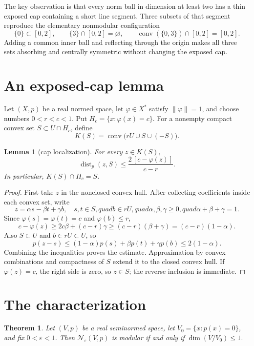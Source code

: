 \documentclass[11pt]{article}
\newtheorem{theorem}{Theorem}
\newtheorem{lemma}{Lemma}
\newcommand{\clconv}{\overline{\operatorname{conv}}}
\newcommand{\dist}{\operatorname{dist}}
\begin{document}
The key observation is that every norm ball in dimension at least two has a
thin exposed cap containing a short line segment.  Three subsets of that
segment reproduce the elementary nonmodular configuration
\[
 \{0\}\subset[0,2],\qquad \{3\}\cap[0,2]=\varnothing,
 \qquad \operatorname{conv}(\{0,3\})\cap[0,2]=[0,2].
\]
Adding a common inner ball and reflecting through the origin makes all three
sets absorbing and centrally symmetric without changing the exposed cap.

\section{An exposed-cap lemma}

Let $(X,p)$ be a real normed space, let $\varphi\in X^*$ satisfy
$\|\varphi\|=1$, and choose numbers $0<r<c<1$.  Put
$H_c=\{x:\varphi(x)=c\}$.  For a nonempty compact convex set
$S\subset U\cap H_c$, define
\[
 K(S)=\clconv\bigl(rU\cup S\cup(-S)\bigr).
\]

\begin{lemma}[cap localization]
For every $z\in K(S)$,
\[
 \dist_p(z,S)\le \frac{2\,[c-\varphi(z)]}{c-r}.
\]
In particular, $K(S)\cap H_c=S$.
\end{lemma}

\begin{proof}
First take $z$ in the nonclosed convex hull.  After collecting coefficients
inside each convex set, write
\[
 z=\alpha s-\beta t+\gamma b,
 \quad s,t\in S,quad b\in rU,quad
 \alpha,\beta,\gamma\ge0,quad \alpha+\beta+\gamma=1.
\]
Since $\varphi(s)=\varphi(t)=c$ and $\varphi(b)\le r$,
\[
 c-\varphi(z)
 \ge 2c\beta+(c-r)\gamma
 \ge(c-r)(\beta+\gamma)=(c-r)(1-\alpha).
\]
Also $S\subset U$ and $b\in rU\subset U$, so
\[
 p(z-s)\le(1-\alpha)p(s)+\beta p(t)+\gamma p(b)
 \le2(1-\alpha).
\]
Combining the inequalities proves the estimate.  Approximation by convex
combinations and compactness of $S$ extend it to the closed convex hull.  If
$\varphi(z)=c$, the right side is zero, so $z\in S$; the reverse inclusion is
immediate.
\end{proof}

\section{The characterization}

\begin{theorem}
Let $(V,p)$ be a real seminormed space, let
$V_0=\{x:p(x)=0\}$, and fix $0<\varepsilon<1$.  Then
$\mathcal N_\varepsilon(V,p)$ is modular if and only if
$\dim(V/V_0)\le1$.
\end{theorem}
\end{document}
